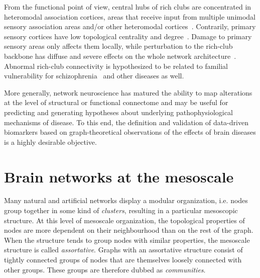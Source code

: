 \documentclass[11pt,              a4paper,              twoside,openright,              titlepage,              headinclude,footinclude,                            numbers=noenddot,              cleardoublepage=empty,]{scrreprt}
\begin{document}
From the functional point of view, central hubs of rich clubs are concentrated in heteromodal association cortices, areas that receive input from multiple unimodal sensory association areas and/or other heteromodal cortices~\cite{sporns2007,power2013,kandel2013}.
Contrarily, primary sensory cortices have low topological centrality and degree~\cite{vandenheuvel2011,zamora-lopez2010,harriger2012}.
Damage to primary sensory areas only affects them locally, while perturbation to the rich-club backbone has diffuse and severe effects on the whole network architecture~\cite{honey2008,ball2014}.
Abnormal rich-club connectivity is hypothesized to be related to familial vulnerability for schizophrenia~\cite{collin2014impaired} and other diseases as well.

More generally, network neuroscience has matured the ability to map alterations at the level of structural or functional connectome and may be useful for predicting and generating hypotheses about underlying pathophysiological mechanisms of disease.
To this end, the definition and validation of data-driven biomarkers based on graph-theoretical observations of the effects of brain diseases is a highly desirable objective.

\section{Brain networks at the mesoscale}
Many natural and artificial networks display a modular organization, i.e. nodes group together in some kind of \emph{clusters}, resulting in a particular mesoscopic structure.
At this level of mesoscale organization, the topological properties of nodes are more dependent on their neighbourhood than on the rest of the graph.
When the structure tends to group nodes with similar properties, the mesoscale structure is called \emph{assortative}.
Graphs with an assortative structure consist of tightly connected groups of nodes that are themselves loosely connected with other groups.
These groups are therefore dubbed as \emph{communities}.
\end{document}
